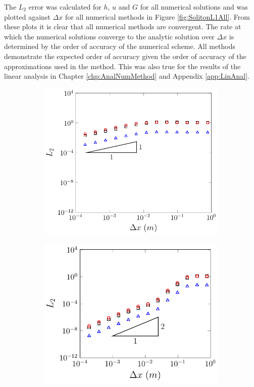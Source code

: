 The $L_2$ error was calculated for $h$, $u$ and $G$ for all numerical solutions and was plotted against $\Delta x$ for all numerical methods in Figure \ref{fig:SolitonL1All}. From these plots it is clear that all numerical methods are convergent. The rate at which the numerical solutions converge to the analytic solution over $\Delta x$ is determined by the order of accuracy of the numerical scheme. All methods demonstrate the expected order of accuracy given the order of accuracy of the approximations used in the method. This was also true for the results of the linear analysis in Chapter \ref{chp:AnalNumMethod} and Appendix \ref{app:LinAnal}. 
\begin{figure}
	\centering
	\begin{subfigure}{0.5\textwidth}
		\includegraphics[width=\textwidth]{./chp5/figures/Analytic/Soliton/L2/FDVM1.pdf}
		\vspace{0.5cm}
	\end{subfigure}%
	\begin{subfigure}{0.5\textwidth}
		\includegraphics[width=\textwidth]{./chp5/figures/Analytic/Soliton/L2/FDVM2.pdf}

\end{subfigure}
\end{figure}
